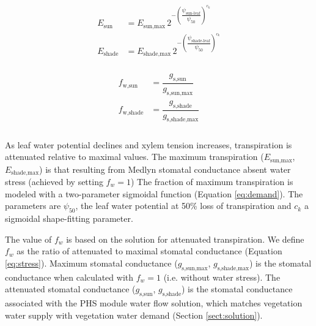 \documentclass[draft,linenumbers]{agujournal}
\begin{document}
     \begin{linenomath*}
     \begin{eqnarray}
     \begin{aligned}
     \label{eq:demand}
     E_{\text{sun}}     &= E_{\text{sun,max}} \, 2^{-\left(\dfrac{\psi_{\text{sun-leaf}}}{\psi_{50}}\right)^{c_k}} \\
     E_{\text{shade}} &= E_{\text{shade,max}} \, 2^{-\left(\dfrac{\psi_{\text{shade-leaf}}}{\psi_{50}}\right)^{c_k}}
     \end{aligned}
     \end{eqnarray}
     \end{linenomath*}
    
    
     \begin{linenomath*}
     \begin{eqnarray}
     \begin{aligned}
     \label{eq:stress}
     f_{\text{w,sun}}         &= \dfrac{g_{\text{s,sun}}}{g_{\text{s,sun,max}}} \\
     f_{\text{w,shade}}     &= \dfrac{g_{\text{s,shade}}}{g_{\text{s,shade,max}}} \\
     \end{aligned}
     \end{eqnarray}
     \end{linenomath*}
    
     As leaf water potential declines and xylem tension increases, transpiration is attenuated relative to maximal values.
     The maximum transpiration ($E_{\text{sun,max}}$, $E_{\text{shade,max}}$) is that resulting from Medlyn stomatal conductance absent water stress (achieved by setting $f_w=1$)
     The fraction of maximum transpiration is modeled with a two-parameter sigmoidal function (Equation \ref{eq:demand}). 
     The parameters are $\psi_{50}$, the leaf water potential at 50\% loss of transpiration and 
     $c_k$ a sigmoidal shape-fitting parameter.
    
    The value of $f_w$ is based on the solution for attenuated transpiration.
    We define $f_w$ as the ratio of attenuated to maximal stomatal conductance (Equation \ref{eq:stress}).
    Maximum stomatal conductance ($g_{\text{s,sun,max}}$, $g_{\text{s,shade,max}}$) is the stomatal conductance when calculated with $f_w=1$
    (i.e. without water stress). 
    The attenuated stomatal conductance ($g_{\text{s,sun}}$, $g_{\text{s,shade}}$) is the stomatal conductance associated with the PHS module
    water flow solution, which matches vegetation water supply with vegetation water demand 
    (Section \ref{sect:solution}).
    
\end{document}
